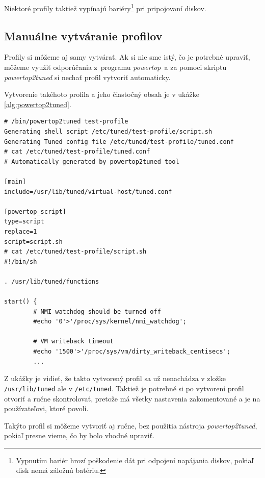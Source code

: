 Niektoré profily taktiež vypínajú bariéry\footnote{Vypnutím bariér hrozí
poškodenie dát pri odpojení napájania diskov, pokiaľ disk nemá záložnú
batériu.} pri pripojovaní diskov. 

%
%

\subsection{Manuálne vytváranie profilov}
\label{sec:powertop2tuned}

Profily si môžeme aj samy vytvárať. Ak si nie sme istý, čo je potrebné upraviť,
môžeme využiť odporúčania z~programu \emph{powertop}\cite{powertopHomepage}~a
za pomoci skriptu \emph{powertop2tuned} si nechať profil vytvoriť automaticky.

Vytvorenie takéhoto profila a jeho čiastočný obsah je v ukážke \ref{alg:powertop2tuned}.

\renewcommand{\lstlistingname}{Ukážka}
\begin{lstlisting}[label=alg:powertop2tuned,caption=Príklad vytvorenia profilu za pomoci powertop2tuned]
# /bin/powertop2tuned test-profile
Generating shell script /etc/tuned/test-profile/script.sh
Generating Tuned config file /etc/tuned/test-profile/tuned.conf
# cat /etc/tuned/test-profile/tuned.conf
# Automatically generated by powertop2tuned tool

[main]
include=/usr/lib/tuned/virtual-host/tuned.conf

[powertop_script]
type=script
replace=1
script=script.sh
# cat /etc/tuned/test-profile/script.sh
#!/bin/sh

. /usr/lib/tuned/functions

start() {
        # NMI watchdog should be turned off
        #echo '0'>'/proc/sys/kernel/nmi_watchdog';

        # VM writeback timeout
        #echo '1500'>'/proc/sys/vm/dirty_writeback_centisecs';
        ...
\end{lstlisting}
\renewcommand{\lstlistingname}{\listingAlgoritmus}

Z ukážky je vidieť, že takto vytvorený profil sa už nenachádza v zložke
\texttt{/usr/lib/tuned} ale v \texttt{/etc/tuned}. Taktiež je potrebné si po
vytvorení profil otvoriť a ručne skontrolovať, pretože má všetky nastavenia
zakomentované a je na používateľovi, ktoré povolí. 

Takýto profil si môžeme vytvoriť aj ručne, bez použitia nástroja
\emph{powertop2tuned}, pokiaľ presne vieme, čo by bolo vhodné upraviť. 

